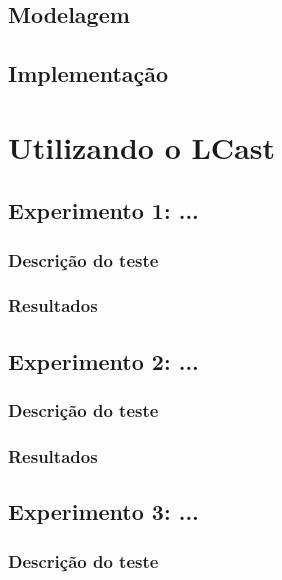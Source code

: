 \documentclass[
10pt, %
a4paper, %
oneside, %
headinclude,footinclude, %
BCOR5mm, %
]{scrartcl}
\theoremstyle{definition} %
\theoremstyle{plain} %
\theoremstyle{remark} %
\begin{document}
\subsection{Modelagem}

\subsection{Implementação}

\newpage




\section{Utilizando o LCast}

\subsection{Experimento 1: ...}

\subsubsection{Descrição do teste}
\subsubsection{Resultados}

\subsection{Experimento 2: ...}

\subsubsection{Descrição do teste}
\subsubsection{Resultados}

\subsection{Experimento 3: ...}

\subsubsection{Descrição do teste}
\end{document}
